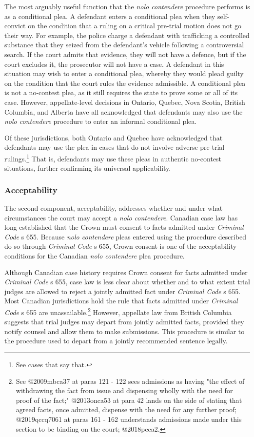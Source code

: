 The most arguably useful function that the \textit{nolo contendere} procedure performs is as a conditional plea. A defendant enters a conditional plea when they self-convict on the condition that a ruling on a critical pre-trial motion does not go their way. For example, the police charge a defendant with trafficking a controlled substance that they seized from the defendant's vehicle following a controversial search. If the court admits that evidence, they will not have a defence, but if the court excludes it, the prosecutor will not have a case. A defendant in this situation may wish to enter a conditional plea, whereby they would plead guilty on the condition that the court rules the evidence admissible. A conditional plea is not a no-contest plea, as it still requires the state to prove some or all of its case. However, appellate-level decisions in Ontario, Quebec, Nova Scotia, British Columbia, and Alberta have all acknowledged that defendants may also use the \textit{nolo contendere} procedure to enter an informal conditional plea. 

Of these jurisdictions, both Ontario and Quebec have acknowledged that defendants may use the plea in cases that do not involve adverse pre-trial rulings.\footnote{See cases that say that.} That is, defendants may use these pleas in authentic no-contest situations, further confirming its universal applicability.

\subsubsection{Acceptability}

The second component, acceptability, addresses whether and under what circumstances the court may accept a \textit{nolo contendere}. Canadian case law has long established that the Crown must consent to facts admitted under \textit{Criminal Code} s 655. Because \textit{nolo contendere} pleas entered using the procedure described do so through \textit{Criminal Code} s 655, Crown consent is one of the acceptability conditions for the Canadian \textit{nolo contendere} plea procedure.

Although Canadian case history requires Crown consent for facts admitted under \textit{Criminal Code} s 655, case law is less clear about whether and to what extent trial judges are allowed to reject a jointly admitted fact under \textit{Criminal Code} s 655. Most Canadian jurisdictions hold the rule that facts admitted under \textit{Criminal Code} s 655 are unassailable.\footnote{See @2009mbca37 at paras 121 - 122 sees admissions as having "the effect of withdrawing the fact from issue and dispensing wholly with the need for proof of the fact;" @2013onca53 at para 42 lands on the side of stating that agreed facts, once admitted, dispense with the need for any further proof; @2019qccq7061 at paras 161 - 162 understands admissions made under this section to be binding on the court; @2018peca2.} However, appellate law from British Columbia suggests that trial judges may depart from jointly admitted facts, provided they notify counsel and allow them to make submissions. This procedure is similar to the procedure used to depart from a jointly recommended sentence legally.

